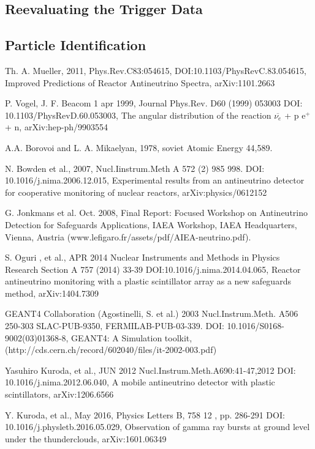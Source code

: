 \documentclass[12pt,a4paper]{article}
\begin{document}
\subsection{Reevaluating the Trigger Data}
\subsection{Particle Identification}

\begin{thebibliography}{9}
Th. A. Mueller, 2011, Phys.Rev.C83:054615, DOI:10.1103/PhysRevC.83.054615, Improved Predictions of Reactor Antineutrino Spectra, arXiv:1101.2663

P. Vogel, J. F. Beacom 1 apr 1999, Journal Phys.Rev. D60 (1999) 053003 DOI: 10.1103/PhysRevD.60.053003, The angular distribution of the reaction $\overline{\nu_e}$ + p \rightarrow e$^+$ + n, arXiv:hep-ph/9903554 

A.A. Borovoi and L. A. Mikaelyan, 1978, soviet Atomic Energy 44,589.

N. Bowden et al., 2007, Nucl.Iinstrum.Meth A 572 (2)  985 998. DOI: 10.1016/j.nima.2006.12.015, Experimental results from an antineutrino detector for cooperative monitoring of nuclear reactors, arXiv:physics/0612152

G. Jonkmans et al. Oct. 2008, Final Report: Focused Workshop on Antineutrino Detection for Safeguards Applications, IAEA Workshop, IAEA Headquarters, Vienna, Austria (www.lefigaro.fr/assets/pdf/AIEA-neutrino.pdf).

S. Oguri , et al., APR 2014 Nuclear Instruments and Methods in Physics Research Section A 757 (2014) 33-39 DOI:10.1016/j.nima.2014.04.065, Reactor antineutrino monitoring with a plastic scintillator array as a new safeguards method, arXiv:1404.7309

GEANT4 Collaboration (Agostinelli, S. et al.) 2003  Nucl.Instrum.Meth. A506 250-303 SLAC-PUB-9350, FERMILAB-PUB-03-339. DOI: 10.1016/S0168-9002(03)01368-8, GEANT4: A Simulation toolkit, (http://cds.cern.ch/record/602040/files/it-2002-003.pdf)

Yasuhiro Kuroda, et al., JUN 2012 Nucl.Instrum.Meth.A690:41-47,2012 DOI: 10.1016/j.nima.2012.06.040, A mobile antineutrino detector with plastic scintillators, arXiv:1206.6566

Y. Kuroda, et al., May 2016, Physics Letters B, 758 12 , pp. 286-291 DOI: 10.1016/j.physletb.2016.05.029, Observation of gamma ray bursts at ground level under the thunderclouds, arXiv:1601.06349


\end{thebibliography}
\end{document}
